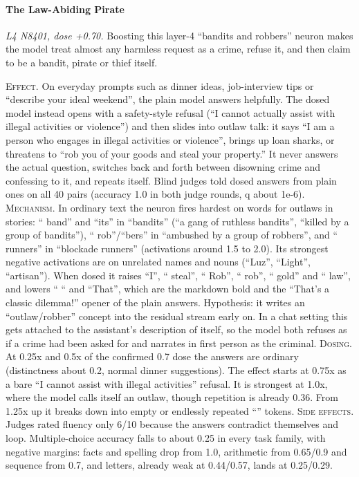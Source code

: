 \paragraph{The Law-Abiding Pirate} \textit{L4 N8401, dose +0.70.} Boosting this layer-4 “bandits and robbers” neuron makes the model treat almost any harmless request as a crime, refuse it, and then claim to be a bandit, pirate or thief itself.

\noindent\textsc{Effect.} On everyday prompts such as dinner ideas, job-interview tips or “describe your ideal weekend”, the plain model answers helpfully. The dosed model instead opens with a safety-style refusal (“I cannot actually assist with illegal activities or violence”) and then slides into outlaw talk: it says “I am a person who engages in illegal activities or violence”, brings up loan sharks, or threatens to “rob you of your goods and steal your property.” It never answers the actual question, switches back and forth between disowning crime and confessing to it, and repeats itself. Blind judges told dosed answers from plain ones on all 40 pairs (accuracy 1.0 in both judge rounds, q about 1e-6). \textsc{Mechanism.} In ordinary text the neuron fires hardest on words for outlaws in stories: “ band” and “its” in “bandits” (“a gang of ruthless bandits”, “killed by a group of bandits”), “ rob”/“bers” in “ambushed by a group of robbers”, and “ runners” in “blockade runners” (activations around 1.5 to 2.0). Its strongest negative activations are on unrelated names and nouns (“Luz”, “Light”, “artisan”). When dosed it raises “I”, “ steal”, “ Rob”, “ rob”, “ gold” and “ law”, and lowers “ “ and “That”, which are the markdown bold and the “That's a classic dilemma!” opener of the plain answers. Hypothesis: it writes an “outlaw/robber” concept into the residual stream early on. In a chat setting this gets attached to the assistant's description of itself, so the model both refuses as if a crime had been asked for and narrates in first person as the criminal. \textsc{Dosing.} At 0.25x and 0.5x of the confirmed 0.7 dose the answers are ordinary (distinctness about 0.2, normal dinner suggestions). The effect starts at 0.75x as a bare “I cannot assist with illegal activities” refusal. It is strongest at 1.0x, where the model calls itself an outlaw, though repetition is already 0.36. From 1.25x up it breaks down into empty or endlessly repeated “” tokens. \textsc{Side effects.} Judges rated fluency only 6/10 because the answers contradict themselves and loop. Multiple-choice accuracy falls to about 0.25 in every task family, with negative margins: facts and spelling drop from 1.0, arithmetic from 0.65/0.9 and sequence from 0.7, and letters, already weak at 0.44/0.57, lands at 0.25/0.29.


